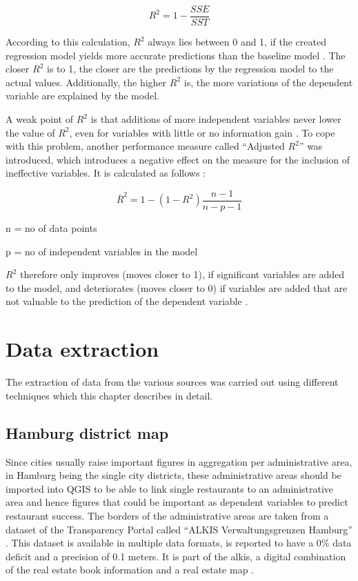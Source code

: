 \documentclass[a4paper, 11pt, oneside]{Thesis}  %
\begin{document}
\[ R^2 = 1 - \frac{SSE}{SST}\]

According to this calculation, $R^2$ always lies between 0 and 1, if the created regression model yields more accurate predictions than the baseline model \cite{Devasthali.2018}. The closer $R^2$ is to 1, the closer are the predictions by the regression model to the actual values. Additionally, the higher $R^2$ is, the more variations of the dependent variable are explained by the model.

A weak point of $R^2$ is that additions of more independent variables never lower the value of $R^2$, even for variables with little or no information gain \cite{Devasthali.2018}. To cope with this problem, another performance measure called ``Adjusted $R^2$'' was introduced, which introduces a negative effect on the measure for the inclusion of ineffective variables. It is calculated as follows \cite{Devasthali.2018}:

\[ \bar{R}^2 = 1 - (1-R^2)\frac{n-1}{n-p-1}\]

n = no of data points

p = no of independent variables in the model

$R^2$ therefore only improves (moves closer to 1), if significant variables are added to the model, and deteriorates (moves closer to 0) if variables are added that are not valuable to the prediction of the dependent variable \cite{Devasthali.2018}. 

\chapter{Data extraction}
\label{Data extraction}

The extraction of data from the various sources was carried out using different techniques which this chapter describes in detail.

\section{Hamburg district map}

Since cities usually raise important figures in aggregation per administrative area, in Hamburg being the single city districts, these administrative areas should be imported into QGIS to be able to link single restaurants to an administrative area and hence figures that could be important as dependent variables to predict restaurant success. The borders of the administrative areas are taken from a dataset of the Transparency Portal called ``ALKIS Verwaltungsgrenzen Hamburg'' \cite{LandesbetriebGeoinformationundVermessung.28.02.2018}. This dataset is available in multiple data formats, is reported to have a 0\% data deficit and a precision of 0.1 meters. It is part of the \ac{alkis}, a digital combination of the real estate book information and a real estate map \cite{ALKIS2019}.
\end{document}
